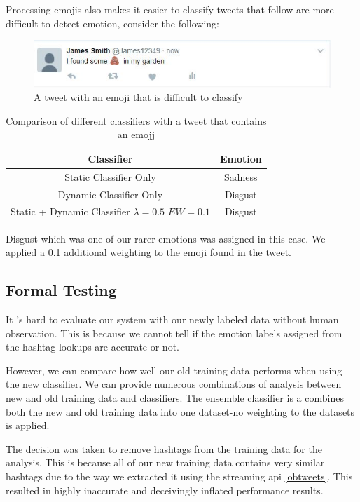 {Processing emojis also makes it easier to classify tweets that follow are more difficult to detect emotion, consider the following:

\begin{figure}[H]
\center
\includegraphics[width=15cm]{images/emojj_tweet_rare.JPG}
\caption{A tweet with an emoji that is difficult to classify}
\end{figure}

\begin{table}[H]
\center
 \begin{tabular}{|c|c|} 
 \hline
 \textbf{Classifier} & \textbf{Emotion} \\ [0.5ex] 
 \hline
 Static Classifier Only & Sadness \\ 
 \hline
 Dynamic Classifier Only & Disgust \\
 \hline
 Static + Dynamic Classifier $\lambda = 0.5$ $EW = 0.1$ & Disgust \\
 \hline
\end{tabular}
\caption{Comparison of different classifiers with a tweet that contains an emojj}
\end{table}

Disgust which was one of our rarer emotions was assigned in this case. We applied a 0.1 additional weighting to the emoji found in the tweet.

\subsection{Formal Testing} \label{fTesting}

It 's hard to evaluate our system with our newly labeled data without human observation. This is because we cannot tell if the emotion labels assigned from the hashtag lookups are accurate or not.

However, we can compare how well our old training data performs when using the new classifier. We can provide numerous combinations of analysis between new and old training data and classifiers. The ensemble classifier is a combines both the new and old training data into one dataset-no weighting to the datasets is applied.

The decision was taken to remove hashtags from the training data for the analysis. This is because all of our new training data contains very similar hashtags due to the way we extracted it using the streaming api \ref{obtweets}. This resulted in highly inaccurate and deceivingly inflated performance results. 

}
